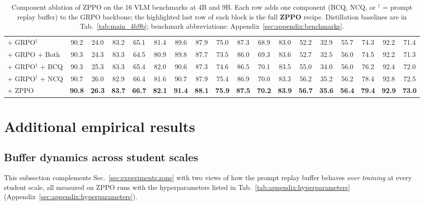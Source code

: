 \documentclass{llmxive}
\begin{document}
\begin{table}[!htbp]
{\begin{tabular}{l*{17}{c}}
    $+$ GRPO$^{\dagger}$ & 90.2 & 24.0 & 83.2 & 65.1 & 81.4 & 89.6 & 87.9 & 75.0 & 87.3 & 68.9 & 83.0 & 52.2 & 32.9 & 55.7 & 74.3 & 92.2 & \cellcolor{gray!10}71.4 \\
    $+$ GRPO $+$ Both & 90.3 & 24.3 & 83.3 & 64.5 & 80.9 & 89.8 & 87.7 & 73.5 & 86.0 & 69.3 & 83.6 & 52.7 & 32.5 & 56.0 & 74.5 & 92.2 & \cellcolor{gray!10}71.3 \\
    $+$ GRPO$^{\dagger}$ $+$ BCQ & 90.3 & 25.3 & 83.3 & 65.4 & 82.0 & 90.6 & 87.3 & 74.6 & 86.5 & 70.1 & 83.5 & 55.0 & 34.0 & 56.0 & 76.2 & 92.4 & \cellcolor{gray!10}72.0 \\
    $+$ GRPO$^{\dagger}$ $+$ NCQ & 90.7 & 26.0 & 82.9 & 66.4 & 81.6 & 90.7 & 87.9 & 75.4 & 86.9 & 70.0 & 83.3 & 56.2 & 35.2 & 56.2 & 78.4 & 92.8 & \cellcolor{gray!10}72.5 \\
    \rowcolor{colorful}
    $+$ ZPPO & \textbf{90.8} & \textbf{26.3} & \textbf{83.7} & \textbf{66.7} & \textbf{82.1} & \textbf{91.4} & \textbf{88.1} & \textbf{75.9} & \textbf{87.5} & \textbf{70.2} & \textbf{83.9} & \textbf{56.7} & \textbf{35.6} & \textbf{56.4} & \textbf{79.4} & \textbf{92.9} & \cellcolor{gray!10}\textbf{73.0} \\
    \bottomrule
    \end{tabular}
    }
    \caption{Component ablation of ZPPO on the 16 VLM benchmarks at 4B and 9B. Each row adds one component (BCQ, NCQ, or $^{\dagger}$ = prompt replay buffer) to the GRPO backbone; the highlighted last row of each block is the full \textbf{ZPPO} recipe. Distillation baselines are in Tab.~\ref{tab:main_4b9b}; benchmark abbreviations: Appendix~\ref{sec:appendix:benchmarks}.}
    \label{tab:ablation_4b9b}
\end{table}




\section{Additional empirical results}
\label{sec:appendix:additional_results}

\subsection{Buffer dynamics across student scales}
\label{sec:appendix:zone}

This subsection complements Sec.~\ref{sec:experiments:zone} with two views of how the prompt replay buffer behaves \emph{over training} at every student scale, all measured on ZPPO runs with the hyperparameters listed in Tab.~\ref{tab:appendix:hyperparameters} (Appendix~\ref{sec:appendix:hyperparameters}).
\end{document}
